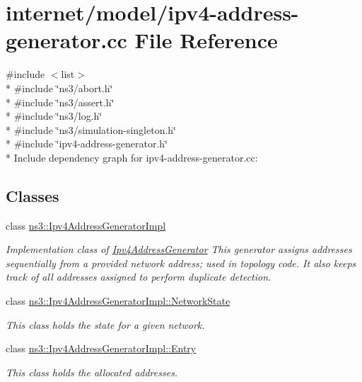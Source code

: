 \hypertarget{ipv4-address-generator_8cc}{}\section{internet/model/ipv4-\/address-\/generator.cc File Reference}
\label{ipv4-address-generator_8cc}
{\ttfamily \#include $<$list$>$}\\*
{\ttfamily \#include \char`\"{}ns3/abort.\+h\char`\"{}}\\*
{\ttfamily \#include \char`\"{}ns3/assert.\+h\char`\"{}}\\*
{\ttfamily \#include \char`\"{}ns3/log.\+h\char`\"{}}\\*
{\ttfamily \#include \char`\"{}ns3/simulation-\/singleton.\+h\char`\"{}}\\*
{\ttfamily \#include \char`\"{}ipv4-\/address-\/generator.\+h\char`\"{}}\\*
Include dependency graph for ipv4-\/address-\/generator.cc\+:
\subsection*{Classes}
\begin{DoxyCompactItemize}
\item 
class \hyperlink{classns3_1_1Ipv4AddressGeneratorImpl}{ns3\+::\+Ipv4\+Address\+Generator\+Impl}
\begin{DoxyCompactList}\small\item\em Implementation class of \hyperlink{classns3_1_1Ipv4AddressGenerator}{Ipv4\+Address\+Generator} This generator assigns addresses sequentially from a provided network address; used in topology code. It also keeps track of all addresses assigned to perform duplicate detection. \end{DoxyCompactList}\item 
class \hyperlink{classns3_1_1Ipv4AddressGeneratorImpl_1_1NetworkState}{ns3\+::\+Ipv4\+Address\+Generator\+Impl\+::\+Network\+State}
\begin{DoxyCompactList}\small\item\em This class holds the state for a given network. \end{DoxyCompactList}\item 
class \hyperlink{classns3_1_1Ipv4AddressGeneratorImpl_1_1Entry}{ns3\+::\+Ipv4\+Address\+Generator\+Impl\+::\+Entry}
\begin{DoxyCompactList}\small\item\em This class holds the allocated addresses. \end{DoxyCompactList}\end{DoxyCompactItemize}
